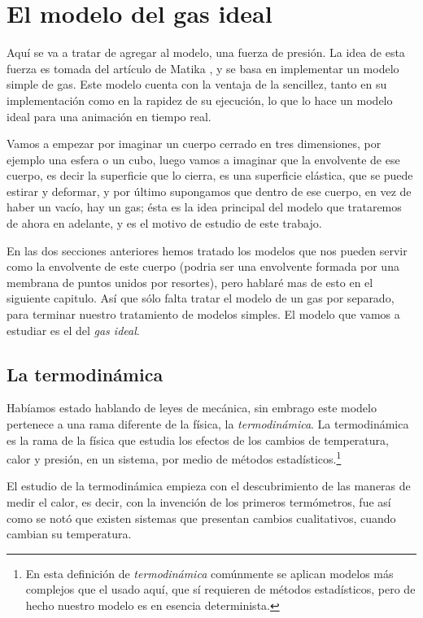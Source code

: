 \section{El modelo del gas ideal}

Aquí se va a tratar de agregar al modelo, una fuerza de presión. La idea de esta fuerza es tomada del artículo de Matika \cite{Matyka:Presion}, y se basa en implementar un modelo simple de gas. Este modelo cuenta con la ventaja de la sencillez, tanto en su implementación como en la rapidez de su ejecución, lo que lo hace un modelo ideal para una animación en tiempo real.

Vamos a empezar por imaginar un cuerpo cerrado en tres dimensiones, por ejemplo una esfera o un cubo, luego vamos a imaginar que la envolvente de ese cuerpo, es decir la superficie que lo cierra, es una superficie elástica, que se puede estirar y deformar, y por último supongamos que dentro de ese cuerpo, en vez de haber un vacío, hay un gas; ésta es la idea principal del modelo que trataremos de ahora en adelante, y es el motivo de estudio de este trabajo.

En las dos secciones anteriores hemos tratado los modelos que nos pueden servir como la envolvente de este cuerpo (podria ser una envolvente formada por una membrana de puntos unidos por resortes), pero hablaré mas de esto en el siguiente capitulo. Así que sólo falta tratar el modelo de un gas por separado, para terminar nuestro tratamiento de modelos simples. El modelo que vamos a estudiar es el del \emph{gas ideal}.

\subsection{La termodinámica}

Habíamos estado hablando de leyes de mecánica, sin embrago este modelo pertenece a una rama diferente de la física, la \emph{termodinámica}. La termodinámica es la rama de la física que estudia los efectos de los cambios de temperatura, calor y presión, en un sistema, por medio de métodos estadísticos.\footnote{En esta definición de \emph{termodinámica} comúnmente se aplican modelos más complejos que el usado aquí, que sí requieren de métodos estadísticos, pero de hecho nuestro modelo es en esencia determinista.}

El estudio de la termodinámica empieza con el descubrimiento de las maneras de medir el calor, es decir, con la invención de los primeros termómetros, fue así como se notó que existen sistemas que presentan cambios cualitativos, cuando cambian su temperatura.

